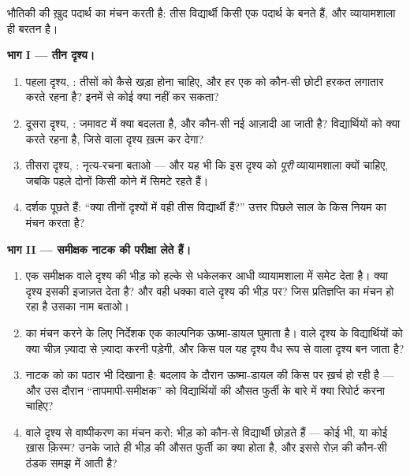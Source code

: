 \begin{problem}\label{pb:g7:states-of-matter:1}
भौतिकी की  ख़ुद पदार्थ का मंचन करती है: तीस विद्यार्थी किसी एक
पदार्थ के  बनते हैं, और व्यायामशाला ही बरतन है।

\medskip\noindent\textbf{भाग I --- तीन दृश्य।}
\begin{enumerate}
  \item पहला दृश्य, : तीसों को कैसे खड़ा होना चाहिए, और हर एक को
        कौन-सी छोटी हरकत लगातार करते रहना है? इनमें से कोई क्या नहीं
        कर सकता?
  \item दूसरा दृश्य, : जमावट में क्या बदलता है, और कौन-सी नई
        आज़ादी आ जाती है? विद्यार्थियों को क्या करते रहना है, जिसे
         वाला दृश्य ख़त्म कर देगा?
  \item तीसरा दृश्य, : नृत्य-रचना बताओ --- और यह भी कि इस दृश्य को
        \emph{पूरी} व्यायामशाला क्यों चाहिए, जबकि पहले दोनों किसी
        कोने में सिमटे रहते हैं।
  \item दर्शक पूछते हैं: ``क्या तीनों दृश्यों में वही तीस
        विद्यार्थी हैं?'' उत्तर पिछले साल के किस नियम का मंचन करता
        है?
\end{enumerate}

\medskip\noindent\textbf{भाग II --- समीक्षक नाटक की परीक्षा लेते
हैं।}
\begin{enumerate}[resume]
  \item एक समीक्षक  वाले दृश्य की भीड़ को हल्के से धकेलकर आधी
        व्यायामशाला में समेट देता है। क्या दृश्य इसकी इजाज़त देता है?
        और वही धक्का  वाले दृश्य की भीड़ पर? जिस प्रतिज्ञप्ति का
        मंचन हो रहा है उसका नाम बताओ।
  \item \emph{} का मंचन करने के लिए निर्देशक एक काल्पनिक ऊष्मा-डायल
        घुमाता है।  वाले दृश्य के विद्यार्थियों को क्या चीज़
        ज़्यादा से ज़्यादा करनी पड़ेगी, और किस पल यह दृश्य वैध रूप से
         वाला दृश्य बन जाता है?
  \item नाटक को  का पठार भी दिखाना है: बदलाव के दौरान ऊष्मा-डायल
        की  किस पर ख़र्च हो रही है --- और उस दौरान
        ``तापमापी-समीक्षक'' को विद्यार्थियों की औसत फुर्ती के बारे
        में क्या रिपोर्ट करना चाहिए?
  \item {} वाले दृश्य से वाष्पीकरण का मंचन करो: भीड़ को कौन-से
        विद्यार्थी छोड़ते हैं --- कोई भी, या कोई ख़ास क़िस्म? उनके
        जाते ही भीड़ की औसत फुर्ती का क्या होता है, और इससे रोज़ की
        कौन-सी ठंडक समझ में आती है?
\end{enumerate}


\end{problem}

